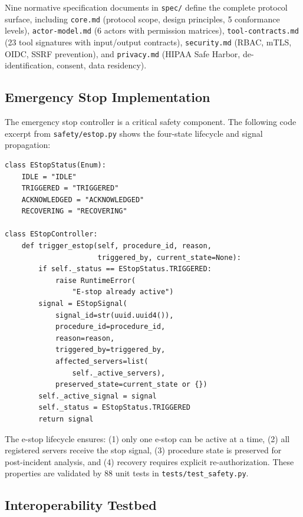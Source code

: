 Nine normative specification documents in \texttt{spec/} define the complete protocol surface, including \texttt{core.md} (protocol scope, design principles, 5 conformance levels), \texttt{actor-model.md} (6 actors with permission matrices), \texttt{tool-contracts.md} (23 tool signatures with input/output contracts), \texttt{security.md} (RBAC, mTLS, OIDC, SSRF prevention), and \texttt{privacy.md} (HIPAA Safe Harbor, de-identification, consent, data residency).

\subsection{Emergency Stop Implementation}

The emergency stop controller is a critical safety component. The following code excerpt from \texttt{safety/estop.py} shows the four-state lifecycle and signal propagation:

\begin{lstlisting}[caption={Emergency stop lifecycle from \texttt{safety/estop.py}.},label={lst:estop}]
class EStopStatus(Enum):
    IDLE = "IDLE"
    TRIGGERED = "TRIGGERED"
    ACKNOWLEDGED = "ACKNOWLEDGED"
    RECOVERING = "RECOVERING"

class EStopController:
    def trigger_estop(self, procedure_id, reason,
                      triggered_by, current_state=None):
        if self._status == EStopStatus.TRIGGERED:
            raise RuntimeError(
                "E-stop already active")
        signal = EStopSignal(
            signal_id=str(uuid.uuid4()),
            procedure_id=procedure_id,
            reason=reason,
            triggered_by=triggered_by,
            affected_servers=list(
                self._active_servers),
            preserved_state=current_state or {})
        self._active_signal = signal
        self._status = EStopStatus.TRIGGERED
        return signal
\end{lstlisting}

The e-stop lifecycle ensures: (1) only one e-stop can be active at a time, (2) all registered servers receive the stop signal, (3) procedure state is preserved for post-incident analysis, and (4) recovery requires explicit re-authorization. These properties are validated by 88 unit tests in \texttt{tests/test\_safety.py}.

\subsection{Interoperability Testbed}

